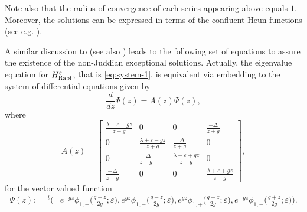 \documentclass[11pt]{article}
\numberwithin{equation}{section}
\newcommand{\e}{\varepsilon}
\newcommand{\HRabi}[1]{H_{\text{\upshape Rabi}}^{#1}} %
\theoremstyle{plain}
\theoremstyle{definition}
\theoremstyle{remark}
\begin{document}
Note also that the radius of convergence of each series appearing above equals $1$. Moreover, the solutions can be expressed in
terms of the confluent Heun functions (see e.g. \cite{MPS2013,Le2016,ZXGBGL2014}).

A similar discussion to \cite{B2013AP} (see also \cite{B2011PRL-OnlineSupplement}) leads to the following set of equations to assure
the existence of the non-Juddian exceptional solutions. Actually, the eigenvalue equation for $\HRabi{\e}$, that is  \eqref{eq:system-1},
is equivalent via embedding to the system of differential equations given by
\begin{equation}\label{eq:embedding}
  \frac{d}{dz} \Psi(z)= A(z)\Psi(z),
\end{equation}
where
\begin{equation}
  A(z)=
  \begin{bmatrix}
    \frac{\lambda-\e-gz}{z+g} & 0 &   0 & \frac{-\Delta}{z+g} \\
    0 & \frac{\lambda+\e-gz}{z+g}  & \frac{-\Delta}{z+g} &0 \\
    0 &  \frac{-\Delta}{z-g} & \frac{\lambda-\e+gz}{z-g}  &0  \\
    \frac{-\Delta}{z-g}   & 0 & 0 & \frac{\lambda+\e+gz}{z-g}
  \end{bmatrix},
\end{equation}
for the vector valued function
\begin{align*}
  \Psi(z): ={}^t\Big(&e^{-gz}\phi_{1,+}\big(\frac{g+z}{2g};\e\big), e^{gz} \phi_{1,-}\big(\frac{g-z}{2g};\e\big),e^{gz} \phi_{1,+}\big(\frac{g-z}{2g};\e\big), e^{-gz} \phi_{1,-}\big(\frac{g+z}{2g};\e\big)\Big).
\end{align*}
  
\end{document}
